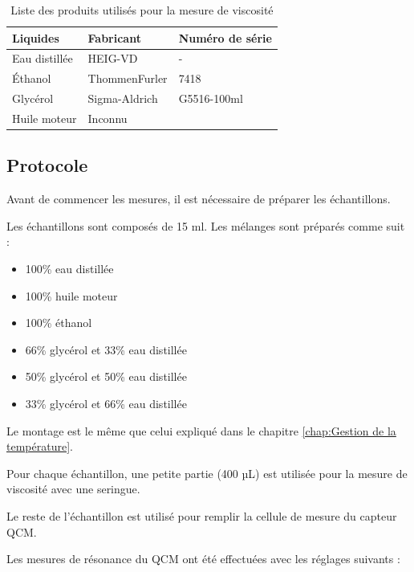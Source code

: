 \begin{table}[H]
    \centering
    \begin{tabular}{|l|l|l|}
        \hline
        \textbf{Liquides}       & \textbf{Fabricant}   & \textbf{Numéro de série} \\
        \hline
        Eau distillée           & HEIG-VD              & -           \\
        Éthanol                 & ThommenFurler        & 7418        \\
        Glycérol                & Sigma-Aldrich        & G5516-100ml \\
        Huile moteur            & Inconnu              &            \\
        \hline
    \end{tabular}
    \caption{Liste des produits utilisés pour la mesure de viscosité}
\end{table}

\subsection{Protocole}

Avant de commencer les mesures, il est nécessaire de préparer les échantillons.

Les échantillons sont composés de 15 ml. Les mélanges sont préparés comme suit :
\begin{itemize}[label=\textbullet]
    \item 100\% eau distillée
    \item 100\% huile moteur
    \item 100\% éthanol
    \item 66\% glycérol et 33\% eau distillée
    \item 50\% glycérol et 50\% eau distillée
    \item 33\% glycérol et 66\% eau distillée
\end{itemize}
Le montage est le même que celui expliqué dans le chapitre \ref{chap:Gestion de la température}.

Pour chaque échantillon, une petite partie (400 µL) est utilisée pour la mesure de viscosité avec une seringue.

Le reste de l'échantillon est utilisé pour remplir la cellule de mesure du capteur QCM.

Les mesures de résonance du QCM ont été effectuées avec les réglages suivants :

